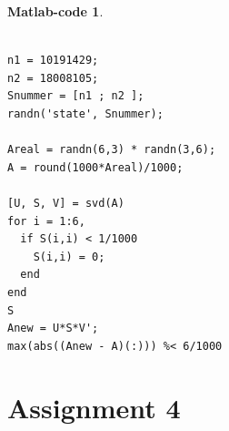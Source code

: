 \documentclass[11pt]{amsart}
\theoremstyle{definition}
\newtheorem*{matlab}{Matlab-code}
\begin{document}
\begin{matlab}~

  \begin{verbatim}

n1 = 10191429;
n2 = 18008105;
Snummer = [n1 ; n2 ];
randn('state', Snummer);

Areal = randn(6,3) * randn(3,6);
A = round(1000*Areal)/1000;

[U, S, V] = svd(A)
for i = 1:6,
  if S(i,i) < 1/1000
    S(i,i) = 0;
  end
end
S
Anew = U*S*V';
max(abs((Anew - A)(:))) %< 6/1000
  \end{verbatim}
\end{matlab}

\section*{Assignment 4}
\end{document}
